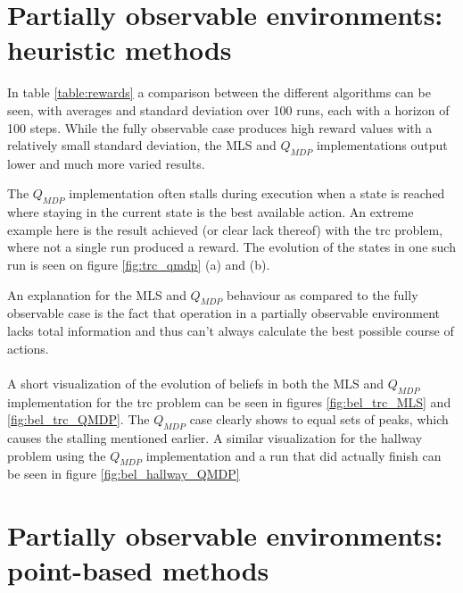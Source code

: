 \documentclass[10pt,a4paper]{article}
\begin{document}
\restoregeometry


\section{Partially observable environments: heuristic methods}

In table \ref{table:rewards} a comparison between the different algorithms can be seen, with averages and standard deviation over 100 runs, each with a horizon of 100 steps.
While the fully observable case produces high reward values with a relatively small standard deviation, the MLS and $Q_{MDP}$ implementations output lower and much more varied results.

The $Q_{MDP}$ implementation often stalls during execution when a state is reached where staying in the current state is the best available action.
An extreme example here is the result achieved (or clear lack thereof) with the trc problem, where not a single run produced a reward. The evolution of the states in one such run is seen on figure \ref{fig:trc_qmdp} (a) and (b).

An explanation for the MLS and $Q_{MDP}$ behaviour as compared to the fully observable case is the fact that operation in a partially observable environment lacks total information and thus can't always calculate the best possible course of actions.\\
\\
A short visualization of the evolution of beliefs in both the MLS and $Q_{MDP}$ implementation for the trc problem can be seen in figures \ref{fig:bel_trc_MLS} and \ref{fig:bel_trc_QMDP}. The $Q_{MDP}$ case clearly shows to equal sets of peaks, which causes the stalling mentioned earlier. A similar visualization for the hallway problem using the $Q_{MDP}$ implementation and a run that did actually finish can be seen in figure \ref{fig:bel_hallway_QMDP}


\section{Partially observable environments: point-based methods}
\end{document}

